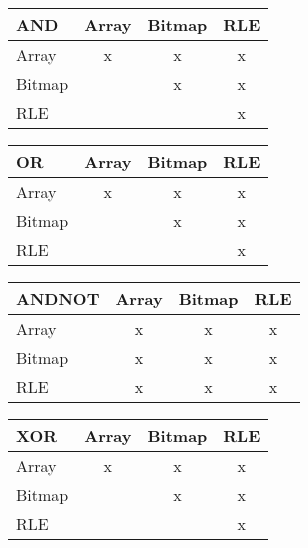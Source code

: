 \documentclass{article} %
\begin{document}

\begin{tabular}{l | c c c |}
  \textbf{AND \hphantom{NOT}} & Array & Bitmap & RLE \\
  \hline
  Array  & x & x & \cellcolor{darkgreen} x \\
  Bitmap &   & x & \cellcolor{darkgreen} x \\
  RLE    &   &   & \cellcolor{darkgreen} x \\
  \hline
\end{tabular}
\hspace{5mm}
\begin{tabular}{l | c c c |}
  \textbf{OR \hphantom{ANDN}} & Array & Bitmap & RLE \\
  \hline
  Array  & x & x & \cellcolor{darkgreen} x \\
  Bitmap &   & x & \cellcolor{darkgreen} x \\
  RLE    &   &   & \cellcolor{darkgreen} x \\
  \hline
\end{tabular}

\vspace{5mm}

\begin{tabular}{l | c c c |}
  \textbf{ANDNOT \hphantom{}} & Array & Bitmap & RLE \\
  \hline
  Array  & x & x & \cellcolor{darkgreen} x \\
  Bitmap & x & x & \cellcolor{darkgreen} x \\
  RLE    & \cellcolor{darkgreen}x & \cellcolor{darkgreen}x & \cellcolor{darkgreen} x \\
  \hline
\end{tabular}
\hspace{5mm}
\begin{tabular}{l | c c c |}
  \textbf{XOR \hphantom{NDN}} & Array & Bitmap & RLE \\
  \hline
  Array  & \cellcolor{darkgreen} x & \cellcolor{darkgreen} x & \cellcolor{darkgreen} x \\
  Bitmap &   & \cellcolor{darkgreen} x & \cellcolor{darkgreen} x \\
  RLE    &   &   & \cellcolor{darkgreen} x \\
  \hline
\end{tabular}
 
\end{document}
